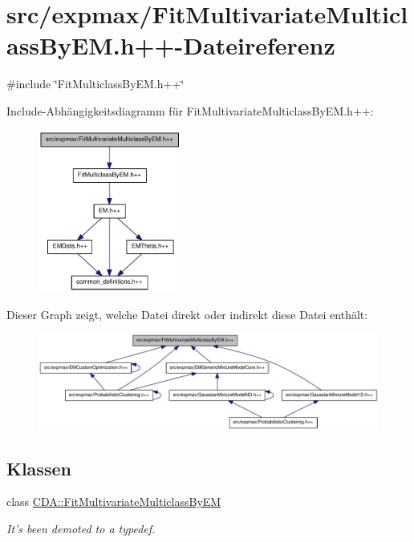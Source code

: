 \hypertarget{FitMultivariateMulticlassByEM_8h_09_09}{
\section{src/expmax/FitMultivariateMulticlassByEM.h++-\/Dateireferenz}
\label{FitMultivariateMulticlassByEM_8h_09_09}
}
{\ttfamily \#include \char`\"{}FitMulticlassByEM.h++\char`\"{}}\par
Include-\/Abhängigkeitsdiagramm für FitMultivariateMulticlassByEM.h++:\nopagebreak
\begin{figure}[H]
\begin{center}
\leavevmode
\includegraphics[width=133pt]{FitMultivariateMulticlassByEM_8h_09_09__incl}
\end{center}
\end{figure}
Dieser Graph zeigt, welche Datei direkt oder indirekt diese Datei enthält:\nopagebreak
\begin{figure}[H]
\begin{center}
\leavevmode
\includegraphics[width=380pt]{FitMultivariateMulticlassByEM_8h_09_09__dep__incl}
\end{center}
\end{figure}
\subsection*{Klassen}
\begin{DoxyCompactItemize}
\item 
class \hyperlink{classCDA_1_1FitMultivariateMulticlassByEM}{CDA::FitMultivariateMulticlassByEM}
\begin{DoxyCompactList}\small\item\em It's been demoted to a typedef. \item\end{DoxyCompactList}\end{DoxyCompactItemize}
